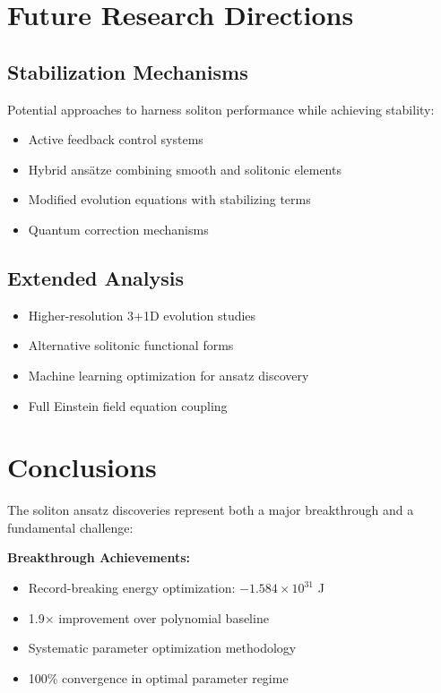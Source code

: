 \documentclass[12pt,a4paper]{article}
\begin{document}
\section{Future Research Directions}

\subsection{Stabilization Mechanisms}

Potential approaches to harness soliton performance while achieving stability:

\begin{itemize}
\item Active feedback control systems
\item Hybrid ansätze combining smooth and solitonic elements
\item Modified evolution equations with stabilizing terms
\item Quantum correction mechanisms
\end{itemize}

\subsection{Extended Analysis}

\begin{itemize}
\item Higher-resolution 3+1D evolution studies
\item Alternative solitonic functional forms
\item Machine learning optimization for ansatz discovery
\item Full Einstein field equation coupling
\end{itemize}

\section{Conclusions}

The soliton ansatz discoveries represent both a major breakthrough and a fundamental challenge:

\textbf{Breakthrough Achievements:}
\begin{itemize}
\item Record-breaking energy optimization: $-1.584 \times 10^{31}$ J
\item 1.9× improvement over polynomial baseline
\item Systematic parameter optimization methodology
\item 100\% convergence in optimal parameter regime
\end{itemize}
\end{document}
